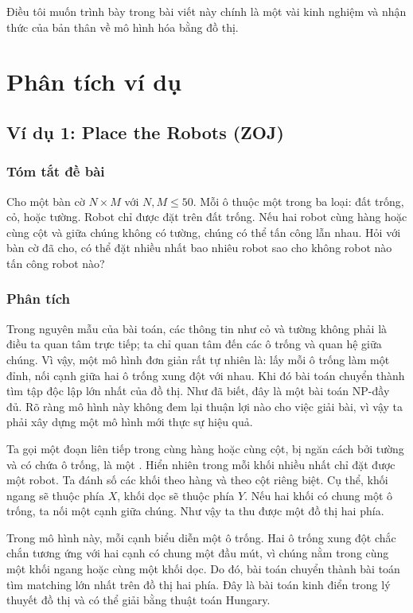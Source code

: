 \documentclass[11pt]{article}
\begin{document}
Điều tôi muốn trình bày trong bài viết này chính là một vài kinh nghiệm và
nhận thức của bản thân về mô hình hóa bằng đồ thị.

\section{Phân tích ví dụ}

\subsection{Ví dụ 1: Place the Robots (ZOJ)}

\subsubsection*{Tóm tắt đề bài}

Cho một bàn cờ $N\times M$ với $N,M\le 50$. Mỗi ô thuộc một trong ba loại:
đất trống, cỏ, hoặc tường. Robot chỉ được đặt trên đất trống. Nếu hai robot
cùng hàng hoặc cùng cột và giữa chúng không có tường, chúng có thể tấn công
lẫn nhau. Hỏi với bàn cờ đã cho, có thể đặt nhiều nhất bao nhiêu robot sao
cho không robot nào tấn công robot nào?

\subsubsection*{Phân tích}

Trong nguyên mẫu của bài toán, các thông tin như cỏ và tường không phải là
điều ta quan tâm trực tiếp; ta chỉ quan tâm đến các ô trống và quan hệ giữa
chúng. Vì vậy, một mô hình đơn giản rất tự nhiên là: lấy mỗi ô trống làm một
đỉnh, nối cạnh giữa hai ô trống xung đột với nhau. Khi đó bài toán chuyển
thành tìm tập độc lập lớn nhất của đồ thị. Như đã biết, đây là một bài toán
NP-đầy đủ. Rõ ràng mô hình này không đem lại thuận lợi nào cho việc giải bài,
vì vậy ta phải xây dựng một mô hình mới thực sự hiệu quả.

Ta gọi một đoạn liên tiếp trong cùng hàng hoặc cùng cột, bị ngăn cách bởi
tường và có chứa ô trống, là một . Hiển nhiên trong mỗi khối nhiều
nhất chỉ đặt được một robot. Ta đánh số các khối theo hàng và theo cột riêng
biệt. Cụ thể, khối ngang sẽ thuộc phía $X$, khối dọc sẽ thuộc phía $Y$. Nếu
hai khối có chung một ô trống, ta nối một cạnh giữa chúng. Như vậy ta thu được
một đồ thị hai phía.

Trong mô hình này, mỗi cạnh biểu diễn một ô trống. Hai ô trống xung đột chắc
chắn tương ứng với hai cạnh có chung một đầu mút, vì chúng nằm trong cùng một
khối ngang hoặc cùng một khối dọc. Do đó, bài toán chuyển thành bài toán tìm
matching lớn nhất trên đồ thị hai phía. Đây là bài toán kinh điển trong lý
thuyết đồ thị và có thể giải bằng thuật toán Hungary.
\end{document}
